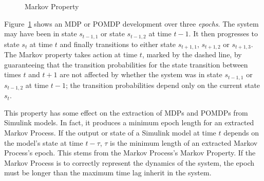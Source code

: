 \begin{figure}
\begin{center}
\end{center}
\caption{Markov Property}
\label{markovproperty}
\end{figure}

Figure~\ref{markovproperty} shows an MDP or POMDP development over three \textit{epochs}. The system may have been in state $s_{t-1,1}$ or state $s_{t-1,2}$ at time $t-1$. It then progresses to state $s_t$ at time $t$ and finally transitions to either state $s_{t+1,1}$, $s_{t+1,2}$ or $s_{t+1,3}$. The Markov property takes action at time $t$, marked by the dashed line, by guaranteeing that the transition probabilities for the state transition between times $t$ and $t+1$ are not affected by whether the system was in state $s_{t-1,1}$ or $s_{t-1,2}$ at time $t-1$; the transition probabilities depend only on the current state $s_t$.

This property has some effect on the extraction of MDPs and POMDPs from Simulink models. In fact, it produces a minimum epoch length for an extracted Markov Process. If the output or state of a Simulink model at time $t$ depends on the model's state at time $t-\tau$, $\tau$ is the minimum length of an extracted Markov Process's epoch. This stems from the Markov Process's Markov Property. If the Markov Process is to correctly represent the dynamics of the system, the epoch must be longer than the maximum time lag inherit in the system.


